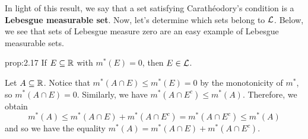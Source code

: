 In light of this result, we say that a set satisfying Carathéodory's condition 
is a {\bf Lebesgue measurable set}. Now, let's determine which sets belong 
to ${\cal L}$. Below, we see that sets of Lebesgue measure zero are an 
easy example of Lebesgue measurable sets. 

\begin{prop}{prop:2.17}
    If $E \subseteq \mathbb{R}$ with $m^*(E) = 0$, then $E \in {\cal L}$.     
\end{prop}
\begin{pf}
    Let $A \subseteq \mathbb{R}$. Notice that $m^*(A \cap E) \leq m^*(E) = 0$
    by the monotonicity of $m^*$, so $m^*(A \cap E) = 0$. 
    Similarly, we have $m^*(A \cap E^c) \leq m^*(A)$. Therefore, we obtain  
    \[ m^*(A) \leq m^*(A \cap E) + m^*(A \cap E^c) = m^*(A \cap E^c) 
    \leq m^*(A) \] 
    and so we have the equality $m^*(A) = m^*(A \cap E) + m^*(A \cap E^c)$. 
\end{pf}
